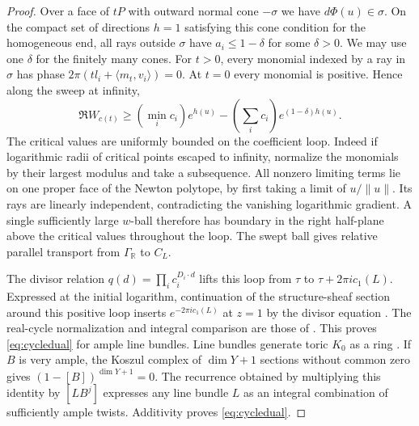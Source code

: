 \begin{proof}
Over a face of $tP$ with outward normal cone $-\sigma$ we have $d\Phi(u)\in\sigma$. On the compact set of directions $h=1$ satisfying this cone condition for the homogeneous end, all rays outside $\sigma$ have $a_i\le1-\delta$ for some $\delta>0$. We may use one $\delta$ for the finitely many cones. For $t>0$, every monomial indexed by a ray in $\sigma$ has phase $2\pi(t l_i+\langle m_t,v_i\rangle)=0$. At $t=0$ every monomial is positive. Hence along the sweep at infinity,
\[
 \Re W_{c(t)}\ge (\min_i c_i)e^{h(u)}-(\sum_i c_i)e^{(1-\delta)h(u)} .
\]
The critical values are uniformly bounded on the coefficient loop. Indeed if logarithmic radii of critical points escaped to infinity, normalize the monomials by their largest modulus and take a subsequence. All nonzero limiting terms lie on one proper face of the Newton polytope, by first taking a limit of $u/\|u\|$. Its rays are linearly independent, contradicting the vanishing logarithmic gradient. A single sufficiently large $w$-ball therefore has boundary in the right half-plane above the critical values throughout the loop. The swept ball gives relative parallel transport from $\Gamma_{\mathbb R}$ to $C_L$.

The divisor relation $q(d)=\prod_i c_i^{D_i\cdot d}$ lifts this loop from $\tau$ to $\tau+2\pi i c_1(L)$. Expressed at the initial logarithm, continuation of the structure-sheaf section around this positive loop inserts $e^{-2\pi i c_1(L)}$ at $z=1$ by the divisor equation \cite[Proposition~2.10(ii)]{Iri}. The real-cycle normalization and integral comparison are those of \cite[\S7.3]{GHIKLS}. This proves \eqref{eq:cycledual} for ample line bundles. Line bundles generate toric $K_0$ as a ring \cite[Theorems~2.2 and 4.1]{San}. If $B$ is very ample, the Koszul complex of $\dim Y+1$ sections without common zero gives $(1-[B])^{\dim Y+1}=0$. The recurrence obtained by multiplying this identity by $[L B^j]$ expresses any line bundle $L$ as an integral combination of sufficiently ample twists. Additivity proves \eqref{eq:cycledual}.
\end{proof}

